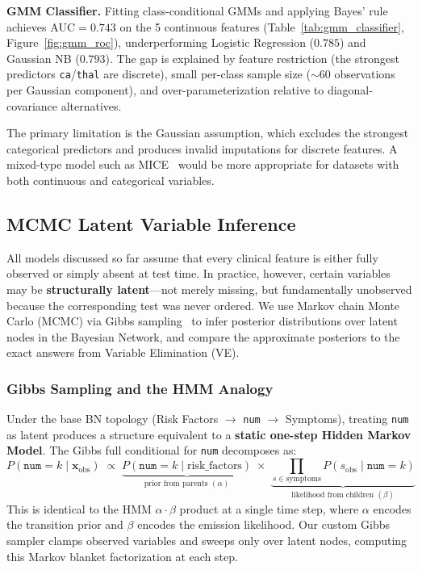 \documentclass{article}
\begin{document}
\textbf{GMM Classifier.} Fitting class-conditional GMMs and applying Bayes' rule~\cite{murphy2012mlpp} achieves $\text{AUC} = 0.743$ on the 5 continuous features (Table~\ref{tab:gmm_classifier}, Figure~\ref{fig:gmm_roc}), underperforming Logistic Regression ($0.785$) and Gaussian NB ($0.793$). The gap is explained by feature restriction (the strongest predictors \texttt{ca}/\texttt{thal} are discrete), small per-class sample size ($\sim$60 observations per Gaussian component), and over-parameterization relative to diagonal-covariance alternatives.

The primary limitation is the Gaussian assumption, which excludes the strongest categorical predictors and produces invalid imputations for discrete features. A mixed-type model such as MICE~\cite{little1987rubin} would be more appropriate for datasets with both continuous and categorical variables.

\subsection{MCMC Latent Variable Inference}

All models discussed so far assume that every clinical feature is either fully observed or simply absent at test time. In practice, however, certain variables may be \textbf{structurally latent}---not merely missing, but fundamentally unobserved because the corresponding test was never ordered. We use Markov chain Monte Carlo (MCMC) via Gibbs sampling~\cite{koller2009pgm} to infer posterior distributions over latent nodes in the Bayesian Network, and compare the approximate posteriors to the exact answers from Variable Elimination (VE).

\subsubsection{Gibbs Sampling and the HMM Analogy}

Under the base BN topology (Risk Factors $\rightarrow$ \texttt{num} $\rightarrow$ Symptoms), treating \texttt{num} as latent produces a structure equivalent to a \textbf{static one-step Hidden Markov Model}. The Gibbs full conditional for \texttt{num} decomposes as:
\begin{equation}
    P(\texttt{num}\!=\!k \mid \mathbf{x}_{\text{obs}}) \;\propto\; \underbrace{P(\texttt{num}\!=\!k \mid \text{risk\_factors})}_{\text{prior from parents } (\alpha)} \;\times\; \underbrace{\prod_{s \in \text{symptoms}} P(s_{\text{obs}} \mid \texttt{num}\!=\!k)}_{\text{likelihood from children } (\beta)}
\end{equation}
This is identical to the HMM $\alpha \cdot \beta$ product at a single time step, where $\alpha$ encodes the transition prior and $\beta$ encodes the emission likelihood. Our custom Gibbs sampler clamps observed variables and sweeps only over latent nodes, computing this Markov blanket factorization at each step.
\end{document}
